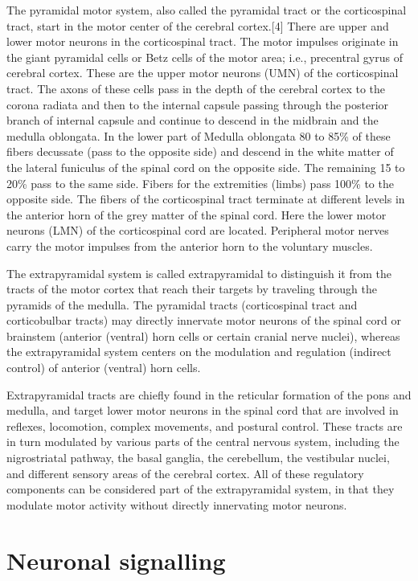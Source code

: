 \documentclass[]{book}
\begin{document}
The pyramidal motor system, also called the pyramidal tract or the corticospinal tract, start in the motor center of the cerebral cortex.{[}4{]} There are upper and lower motor neurons in the corticospinal tract. The motor impulses originate in the giant pyramidal cells or Betz cells of the motor area; i.e., precentral gyrus of cerebral cortex. These are the upper motor neurons (UMN) of the corticospinal tract. The axons of these cells pass in the depth of the cerebral cortex to the corona radiata and then to the internal capsule passing through the posterior branch of internal capsule and continue to descend in the midbrain and the medulla oblongata. In the lower part of Medulla oblongata 80 to 85\% of these fibers decussate (pass to the opposite side) and descend in the white matter of the lateral funiculus of the spinal cord on the opposite side. The remaining 15 to 20\% pass to the same side. Fibers for the extremities (limbs) pass 100\% to the opposite side. The fibers of the corticospinal tract terminate at different levels in the anterior horn of the grey matter of the spinal cord. Here the lower motor neurons (LMN) of the corticospinal cord are located. Peripheral motor nerves carry the motor impulses from the anterior horn to the voluntary muscles.

The extrapyramidal system is called extrapyramidal to distinguish it from the tracts of the motor cortex that reach their targets by traveling through the pyramids of the medulla. The pyramidal tracts (corticospinal tract and corticobulbar tracts) may directly innervate motor neurons of the spinal cord or brainstem (anterior (ventral) horn cells or certain cranial nerve nuclei), whereas the extrapyramidal system centers on the modulation and regulation (indirect control) of anterior (ventral) horn cells.

Extrapyramidal tracts are chiefly found in the reticular formation of the pons and medulla, and target lower motor neurons in the spinal cord that are involved in reflexes, locomotion, complex movements, and postural control. These tracts are in turn modulated by various parts of the central nervous system, including the nigrostriatal pathway, the basal ganglia, the cerebellum, the vestibular nuclei, and different sensory areas of the cerebral cortex. All of these regulatory components can be considered part of the extrapyramidal system, in that they modulate motor activity without directly innervating motor neurons.

\hypertarget{neuronal-signalling}{%
\section{Neuronal signalling}\label{neuronal-signalling}}
\end{document}
